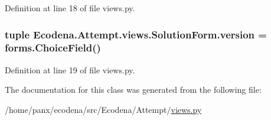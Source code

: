 Definition at line 18 of file views.py.

\hypertarget{class_ecodena_1_1_attempt_1_1views_1_1_solution_form_a77e5671273cfb3207fd55e2b3defd321}{
\subsubsection[{version}]{\setlength{\rightskip}{0pt plus 5cm}tuple {\bf Ecodena.Attempt.views.SolutionForm.version} = forms.ChoiceField()}}
\label{df/d81/class_ecodena_1_1_attempt_1_1views_1_1_solution_form_a77e5671273cfb3207fd55e2b3defd321}


Definition at line 19 of file views.py.



The documentation for this class was generated from the following file:\begin{DoxyCompactItemize}
\item 
/home/panx/ecodena/src/Ecodena/Attempt/\hyperlink{_attempt_2views_8py}{views.py}\end{DoxyCompactItemize}
